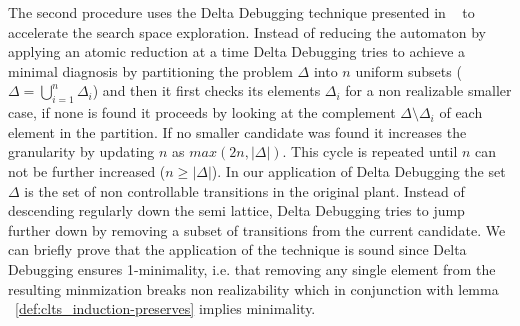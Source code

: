 The second procedure uses the Delta Debugging technique presented in ~\cite{DBLP:journals/tse/ZellerH02} to accelerate the search space exploration. Instead of reducing the automaton by applying an atomic reduction at a time Delta Debugging tries to achieve a minimal diagnosis by partitioning the problem $\Delta$ into $n$ uniform subsets ($\Delta = \bigcup_{i=1}^n \Delta_i $) and then it first checks its elements $\Delta_i$ for a non realizable smaller case, if none is found it proceeds by looking at the complement $\Delta \setminus \Delta_i$ of each element in the partition. If no smaller candidate was found it increases the granularity by updating $n$ as $max(2n,|\Delta|)$. This cycle is repeated until $n$ can not be further increased ($n \geq |\Delta|$). 
In our application of Delta Debugging the set $\Delta$ is the set of non controllable transitions in the original plant. Instead of descending regularly down the semi lattice, Delta Debugging tries to jump further down by removing a subset of transitions from the current candidate. We can briefly prove that the application of the technique is sound since Delta Debugging ensures 1-minimality, i.e. that removing any single element from the resulting minmization breaks non realizability which in conjunction with lemma ~\ref{def:clts_induction-preserves} implies minimality.